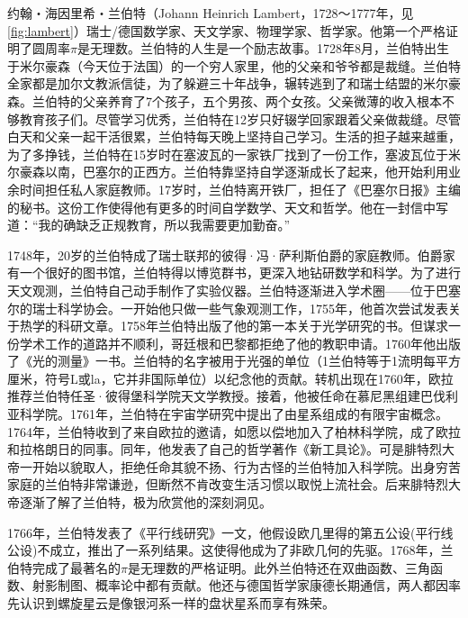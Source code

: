 \documentclass[b5paper]{ctexart}
\begin{document}
\begin{mdframed}
约翰・海因里希・兰伯特（Johann Heinrich Lambert，1728～1777年，见\cref{fig:lambert}）瑞士/德国数学家、天文学家、物理学家、哲学家。他第一个严格证明了圆周率$\pi$是无理数。兰伯特的人生是一个励志故事。1728年8月，兰伯特出生于米尔豪森（今天位于法国）的一个穷人家里，他的父亲和爷爷都是裁缝。兰伯特全家都是加尔文教派信徒，为了躲避三十年战争，辗转逃到了和瑞士结盟的米尔豪森。兰伯特的父亲养育了7个孩子，五个男孩、两个女孩。父亲微薄的收入根本不够教育孩子们。尽管学习优秀，兰伯特在12岁只好辍学回家跟着父亲做裁缝。尽管白天和父亲一起干活很累，兰伯特每天晚上坚持自己学习。生活的担子越来越重，为了多挣钱，兰伯特在15岁时在塞波瓦的一家铁厂找到了一份工作，塞波瓦位于米尔豪森以南，巴塞尔的正西方。兰伯特靠坚持自学逐渐成长了起来，他开始利用业余时间担任私人家庭教师。17岁时，兰伯特离开铁厂，担任了《巴塞尔日报》主编的秘书。这份工作使得他有更多的时间自学数学、天文和哲学。他在一封信中写道：“我的确缺乏正规教育，所以我需要更加勤奋。”

1748年，20岁的兰伯特成了瑞士联邦的彼得·冯·萨利斯伯爵的家庭教师。伯爵家有一个很好的图书馆，兰伯特得以博览群书，更深入地钻研数学和科学。为了进行天文观测，兰伯特自己动手制作了实验仪器。兰伯特逐渐进入学术圈——位于巴塞尔的瑞士科学协会。一开始他只做一些气象观测工作，1755年，他首次尝试发表关于热学的科研文章。1758年兰伯特出版了他的第一本关于光学研究的书。但谋求一份学术工作的道路并不顺利，哥廷根和巴黎都拒绝了他的教职申请。1760年他出版了《光的测量》一书。兰伯特的名字被用于光强的单位（1兰伯特等于1流明每平方厘米，符号L或la，它并非国际单位）以纪念他的贡献。转机出现在1760年，欧拉推荐兰伯特任圣·彼得堡科学院天文学教授。接着，他被任命在慕尼黑组建巴伐利亚科学院。1761年，兰伯特在宇宙学研究中提出了由星系组成的有限宇宙概念。1764年，兰伯特收到了来自欧拉的邀请，如愿以偿地加入了柏林科学院，成了欧拉和拉格朗日的同事。同年，他发表了自己的哲学著作《新工具论》。可是腓特烈大帝一开始以貌取人，拒绝任命其貌不扬、行为古怪的兰伯特加入科学院。出身穷苦家庭的兰伯特非常谦逊，但断然不肯改变生活习惯以取悦上流社会。后来腓特烈大帝逐渐了解了兰伯特，极为欣赏他的深刻洞见。

1766年，兰伯特发表了《平行线研究》一文，他假设欧几里得的第五公设(平行线公设)不成立，推出了一系列结果。这使得他成为了非欧几何的先驱。1768年，兰伯特完成了最著名的$\pi$是无理数的严格证明。此外兰伯特还在双曲函数、三角函数、射影制图、概率论中都有贡献。他还与德国哲学家康德长期通信，两人都因率先认识到螺旋星云是像银河系一样的盘状星系而享有殊荣。
\end{mdframed}
\end{document}
